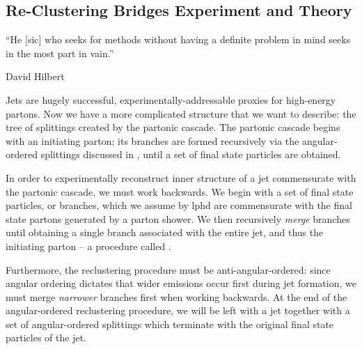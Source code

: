\subsection{Re-Clustering Bridges Experiment and Theory}
\epigraph{
    ``He [sic] who seeks for methods without having a definite problem in mind seeks in the most part in vain.''
}{David Hilbert}


\label{sec:reclustering}

Jets are hugely successful, experimentally-addressable proxies for high-energy partons.
%
Now we have a more complicated structure that we want to describe:
%
the tree of splittings created by the partonic cascade.
%
The partonic cascade begins with an initiating parton;
%
its branches are formed recursively via the angular-ordered splittings discussed in , until a set of final state particles are obtained.

In order to experimentally reconstruct inner structure of a jet commensurate with the partonic cascade, we must work backwards.
%
We begin with a set of final state particles, or branches, which we assume by \gls{lphd} are commensurate with the final state partons generated by a parton shower.
%
We then recursively \textit{merge} branches until obtaining a single branch associated with the entire jet, and thus the initiating parton -- a procedure called .



Furthermore, the \gls{reclustering} procedure must be anti-angular-ordered:
%
since angular ordering dictates that wider emissions occur first during jet formation, we must merge \textit{narrower} branches first when working backwards.
%
At the end of the angular-ordered \gls{reclustering} procedure, we will be left with a jet together with a set of angular-ordered splittings which terminate with the original final state particles of the jet.


